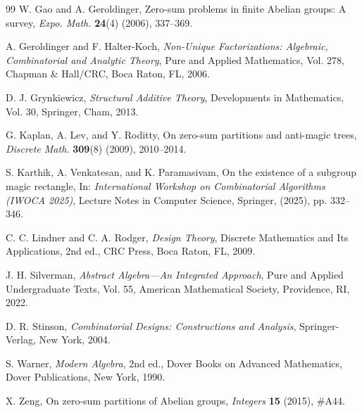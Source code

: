 \documentclass[preprint,11pt]{elsarticle}
\begin{document}
\begin{thebibliography}{99}
W. Gao and A. Geroldinger,
Zero-sum problems in finite Abelian groups: A survey,
\emph{Expo. Math.} \textbf{24}(4) (2006), 337--369.


A. Geroldinger and F. Halter-Koch,
\emph{Non-Unique Factorizations: Algebraic, Combinatorial and Analytic Theory},
Pure and Applied Mathematics, Vol. 278,
Chapman \& Hall/CRC, Boca Raton, FL, 2006.

D. J. Grynkiewicz,
\emph{Structural Additive Theory},
Developments in Mathematics, Vol. 30,
Springer, Cham, 2013.


G. Kaplan, A. Lev, and Y. Roditty,
On zero-sum partitions and anti-magic trees,
\emph{Discrete Math.} \textbf{309}(8) (2009), 2010--2014.


S. Karthik, A. Venkatesan, and K. Paramasivam,
On the existence of a subgroup magic rectangle,
In: \emph{International Workshop on Combinatorial Algorithms (IWOCA 2025)},
Lecture Notes in Computer Science, Springer, (2025), pp. 332--346.


C. C. Lindner and C. A. Rodger,
\emph{Design Theory},
Discrete Mathematics and Its Applications,
2nd ed., CRC Press, Boca Raton, FL, 2009.

J. H. Silverman,
\emph{Abstract Algebra---An Integrated Approach},
Pure and Applied Undergraduate Texts, Vol. 55,
American Mathematical Society, Providence, RI, 2022.

D. R. Stinson,
\emph{Combinatorial Designs: Constructions and Analysis},
Springer-Verlag, New York, 2004.


S. Warner,
\emph{Modern Algebra},
2nd ed.,
Dover Books on Advanced Mathematics,
Dover Publications, New York, 1990.

X. Zeng,
On zero-sum partitions of Abelian groups,
\emph{Integers} \textbf{15} (2015), \#A44.
\end{thebibliography}


\newpage
\end{document}
